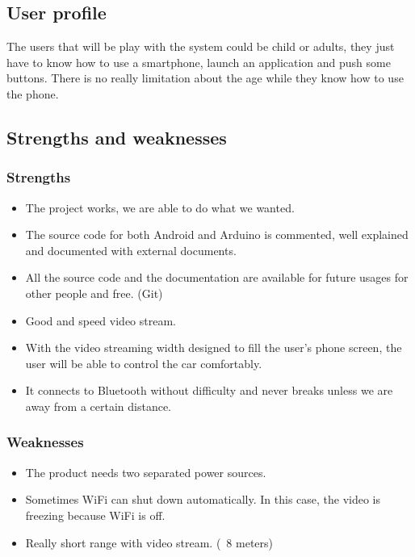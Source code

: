 \documentclass[11pt]{article}
\begin{document}

\subsection{User profile}
\begin{flushleft}
The users that will be play with the system could be child or adults, they just have to know how to use a smartphone, launch an application and push some buttons. There is no really limitation about the age while they know how to use the phone.
\end{flushleft}

\pagebreak

\subsection{Strengths and weaknesses}
\subsubsection{Strengths}
\begin{itemize}
\item The project works, we are able to do what we wanted.
\item The source code for both Android and Arduino is commented, well explained and documented with external documents.
\item All the source code and the documentation are available for future usages for other people and free. (Git)
\item Good and speed video stream.
\item With the video streaming width designed to fill the user's phone screen, the user will be able to control the car comfortably.
\item It connects to Bluetooth without difficulty and never breaks unless we are away from a certain distance.
\end{itemize}

\subsubsection{Weaknesses}
\begin{itemize}
\item The product needs two separated power sources.
\item Sometimes WiFi can shut down automatically. In this case, the video is freezing because WiFi is off.
\item Really short range with video stream. (~8 meters)
\end{itemize}
\end{document}

